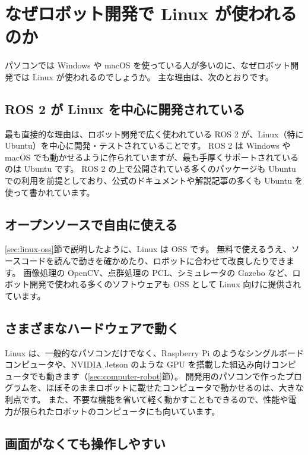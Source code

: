 \section{なぜロボット開発で Linux が使われるのか}
\label{sec:linux-why-robot}

パソコンでは Windows や macOS を使っている人が多いのに、なぜロボット開発では Linux が使われるのでしょうか。
主な理由は、次のとおりです。

\subsection{ROS 2 が Linux を中心に開発されている}

最も直接的な理由は、ロボット開発で広く使われている ROS 2 が、Linux（特に Ubuntu）を中心に開発・テストされていることです。
ROS 2 は Windows や macOS でも動かせるように作られていますが、最も手厚くサポートされているのは Ubuntu です。
ROS 2 の上で公開されている多くのパッケージも Ubuntu での利用を前提としており、公式のドキュメントや解説記事の多くも Ubuntu を使って書かれています。

\subsection{オープンソースで自由に使える}

\ref{sec:linux-oss}節で説明したように、Linux は OSS です。
無料で使えるうえ、ソースコードを読んで動きを確かめたり、ロボットに合わせて改良したりできます。
画像処理の OpenCV、点群処理の PCL、シミュレータの Gazebo など、ロボット開発で使われる多くのソフトウェアも OSS として Linux 向けに提供されています。

\subsection{さまざまなハードウェアで動く}

Linux は、一般的なパソコンだけでなく、Raspberry Pi のようなシングルボードコンピュータや、NVIDIA Jetson のような GPU を搭載した組込み向けコンピュータでも動きます（\ref{sec:computer-robot}節）。
開発用のパソコンで作ったプログラムを、ほぼそのままロボットに載せたコンピュータで動かせるのは、大きな利点です。
また、不要な機能を省いて軽く動かすこともできるので、性能や電力が限られたロボットのコンピュータにも向いています。

\subsection{画面がなくても操作しやすい}

